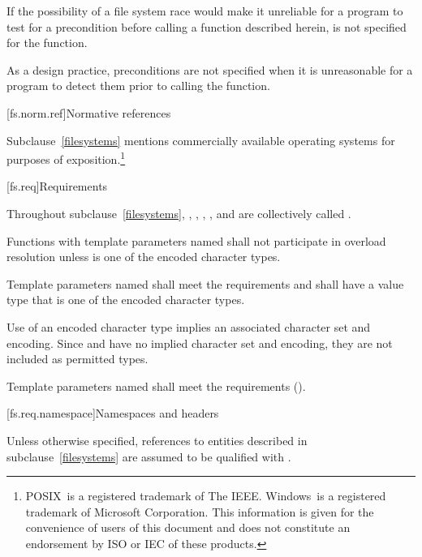\pnum
If the possibility of a file system race would make it unreliable for a
program to test for a precondition before calling a function described herein,
{}\expects is not specified for the function.
\begin{note}
As a design practice, preconditions are not specified when it
is unreasonable for a program to detect them prior to calling the function.
\end{note}

[fs.norm.ref]{Normative references}

\pnum
Subclause~\ref{filesystems} mentions commercially
available operating systems for purposes of exposition.\footnote{
POSIX\textregistered\ is a registered trademark of The IEEE\@.
Windows\textregistered\ is a registered trademark of Microsoft Corporation.
This information is given for the convenience of users of this document and
does not constitute an endorsement by ISO or IEC of these
products.
}

[fs.req]{Requirements}

\pnum
Throughout subclause~\ref{filesystems}, , , ,
, and  are collectively called
.

\pnum
Functions with template parameters named 
shall not participate in overload resolution
unless  is one of the encoded character types.

\pnum
Template parameters named  shall meet the
 requirements and shall
have a value type that is one of the encoded character types.

\pnum
\begin{note}
Use of an encoded character type implies an associated
character set and encoding.
Since  and  have no
implied character set and encoding,
they are not included as permitted types.
\end{note}

\pnum
Template parameters named  shall meet the
 requirements ().

[fs.req.namespace]{Namespaces and headers}

\pnum
Unless otherwise specified, references to entities described in
subclause~\ref{filesystems} are assumed to be qualified with .

